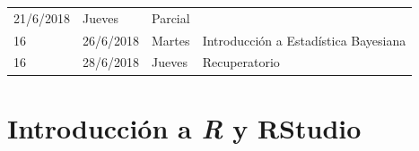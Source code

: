 \documentclass[]{book}
\theoremstyle{definition}
\theoremstyle{definition}
\theoremstyle{definition}
\theoremstyle{remark}
\begin{document}
\begin{longtable}[]{@{}llll@{}}
\begin{minipage}[t]{0.07\columnwidth}
21/6/2018\strut
\end{minipage} & \begin{minipage}[t]{0.05\columnwidth}\raggedright
Jueves\strut
\end{minipage} & \begin{minipage}[t]{0.71\columnwidth}\raggedright
Parcial\strut
\end{minipage}\tabularnewline
\begin{minipage}[t]{0.05\columnwidth}\raggedright
16\strut
\end{minipage} & \begin{minipage}[t]{0.07\columnwidth}\raggedright
26/6/2018\strut
\end{minipage} & \begin{minipage}[t]{0.05\columnwidth}\raggedright
Martes\strut
\end{minipage} & \begin{minipage}[t]{0.71\columnwidth}\raggedright
Introducción a Estadística Bayesiana\strut
\end{minipage}\tabularnewline
\begin{minipage}[t]{0.05\columnwidth}\raggedright
16\strut
\end{minipage} & \begin{minipage}[t]{0.07\columnwidth}\raggedright
28/6/2018\strut
\end{minipage} & \begin{minipage}[t]{0.05\columnwidth}\raggedright
Jueves\strut
\end{minipage} & \begin{minipage}[t]{0.71\columnwidth}\raggedright
Recuperatorio\strut
\end{minipage}\tabularnewline
\bottomrule
\end{longtable}

\hypertarget{introduccion-a-r-y-rstudio}{%
\chapter{\texorpdfstring{Introducción a \emph{R} y
RStudio}{Introducción a R y RStudio}}\label{introduccion-a-r-y-rstudio}}
\end{document}
